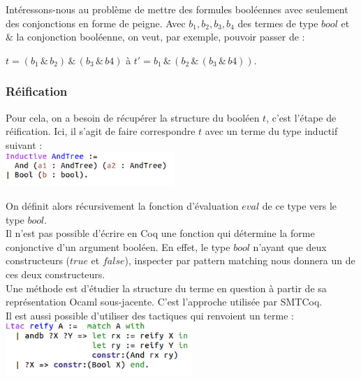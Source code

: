 \documentclass{article}
\begin{document}
Intéressons-nous au problème de mettre des formules booléennes avec seulement des conjonctions en forme de peigne. Avec $b_1, b_2, b_3, b_4$ des termes de type $bool$ et $\&$ la conjonction booléenne, on veut, par exemple, pouvoir passer de : 
\begin{center}
$ t = (b_1 \,\&\, b_2) \,\&\, (b_3 \,\&\, b4)$ \hspace{1cm} à   \hspace{1cm}  $t' = b_1 \,\&\, (b_2 \,\&\, (b_3 \,\&\, b4)). $
\end{center}

\subsubsection{Réification}

Pour cela, on a besoin de récupérer la structure du booléen $t$, c'est l'étape de réification. Ici, il s'agit de faire correspondre $t$ avec un terme du type inductif suivant :\\

\includegraphics[height = 1.3cm]{andtree.png}

On définit alors récursivement la fonction d'évaluation $eval$ de ce type vers le type $bool$. \\

Il n'est pas possible d'écrire en Coq une fonction qui détermine la forme conjonctive d'un argument booléen. En effet, le type $bool$ n'ayant que deux constructeurs ($true$ et $false$), inspecter par pattern matching nous donnera un de ces deux constructeurs.\\

Une méthode est d'étudier la structure du terme en question à partir de sa représentation Ocaml sous-jacente. C'est l'approche utilisée par SMTCoq. \\

Il est aussi possible d'utiliser des tactiques qui renvoient un terme : \\

\includegraphics[height = 2cm]{reify.png}
\end{document}
